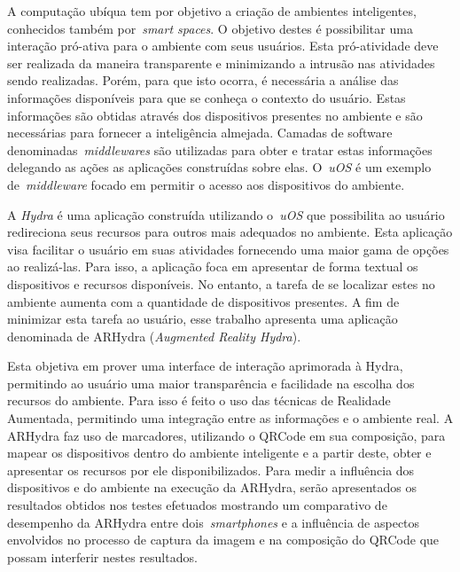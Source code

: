 \begin{resumo}
	
	A computação ubíqua tem por objetivo a criação de ambientes inteligentes, conhecidos também 
	por~\textit{smart spaces}. O objetivo destes é possibilitar uma interação pró-ativa para o ambiente 
	com seus usuários. Esta pró-atividade deve ser realizada da maneira transparente e minimizando 
	a intrusão nas atividades sendo realizadas. Porém, para que isto ocorra, é necessária a análise 
	das informações disponíveis para que se conheça o contexto do usuário. Estas informações são 
	obtidas através dos dispositivos presentes no ambiente e são necessárias para fornecer a 
	inteligência almejada. Camadas de software denominadas~\textit{middlewares} são utilizadas 
	para obter e tratar estas informações delegando as ações as aplicações construídas sobre elas. 
	O~\textit{uOS} é um exemplo de~\textit{middleware} focado em permitir o acesso aos dispositivos 
	do ambiente.

	A \textit{Hydra} é uma aplicação construída utilizando o~\textit{uOS} que possibilita ao usuário 
	redireciona seus recursos para outros mais adequados no ambiente. Esta aplicação visa facilitar 
	o usuário em suas atividades fornecendo uma maior gama de opções ao realizá-las. Para isso, a 
	aplicação foca em apresentar de forma textual os dispositivos e recursos disponíveis. No entanto, 
	a tarefa de se localizar estes no ambiente aumenta com a quantidade de dispositivos presentes. 
	A fim de minimizar esta tarefa ao usuário, esse trabalho apresenta uma aplicação denominada de 
	ARHydra (\textit{Augmented Reality Hydra}). 
	
	Esta objetiva em prover uma interface de interação aprimorada 
	à Hydra, permitindo ao usuário uma maior transparência e facilidade na escolha dos recursos do 
	ambiente.  Para isso é feito o uso das técnicas de Realidade Aumentada, permitindo uma integração 
	entre as informações e o ambiente real.	
	A ARHydra faz uso de marcadores, utilizando o QRCode em sua composição, para mapear os 
	dispositivos dentro do ambiente inteligente e a partir deste, obter e apresentar os recursos 
	por ele disponibilizados. Para medir a influência dos dispositivos e do ambiente na execução da 
	ARHydra, serão apresentados	os resultados obtidos nos testes efetuados mostrando um comparativo 
	de desempenho da ARHydra entre dois~\textit{smartphones} e a influência de aspectos 
	envolvidos no processo de captura da imagem e na composição do QRCode que possam interferir nestes 
	resultados. 
	 
\end{resumo}

